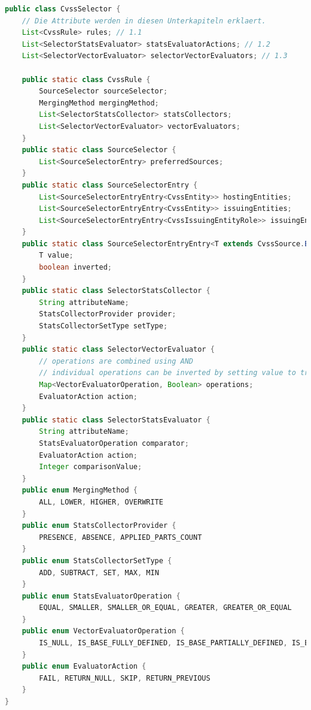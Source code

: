 \begin{lstlisting}[language=Java, label={lst:cvss-selector-class-attributes}, caption={CVSS-Selektor Klassen}, basicstyle=\scriptsize]
public class CvssSelector {
    // Die Attribute werden in diesen Unterkapiteln erklaert.
    List<CvssRule> rules; // 1.1
    List<SelectorStatsEvaluator> statsEvaluatorActions; // 1.2
    List<SelectorVectorEvaluator> selectorVectorEvaluators; // 1.3

    public static class CvssRule {
        SourceSelector sourceSelector;
        MergingMethod mergingMethod;
        List<SelectorStatsCollector> statsCollectors;
        List<SelectorVectorEvaluator> vectorEvaluators;
    }
    public static class SourceSelector {
        List<SourceSelectorEntry> preferredSources;
    }
    public static class SourceSelectorEntry {
        List<SourceSelectorEntryEntry<CvssEntity>> hostingEntities;
        List<SourceSelectorEntryEntry<CvssEntity>> issuingEntities;
        List<SourceSelectorEntryEntry<CvssIssuingEntityRole>> issuingEntityRoles;
    }
    public static class SourceSelectorEntryEntry<T extends CvssSource.EntityNameProvider> {
        T value;
        boolean inverted;
    }
    public static class SelectorStatsCollector {
        String attributeName;
        StatsCollectorProvider provider;
        StatsCollectorSetType setType;
    }
    public static class SelectorVectorEvaluator {
        // operations are combined using AND
        // individual operations can be inverted by setting value to true
        Map<VectorEvaluatorOperation, Boolean> operations;
        EvaluatorAction action;
    }
    public static class SelectorStatsEvaluator {
        String attributeName;
        StatsEvaluatorOperation comparator;
        EvaluatorAction action;
        Integer comparisonValue;
    }
    public enum MergingMethod {
        ALL, LOWER, HIGHER, OVERWRITE
    }
    public enum StatsCollectorProvider {
        PRESENCE, ABSENCE, APPLIED_PARTS_COUNT
    }
    public enum StatsCollectorSetType {
        ADD, SUBTRACT, SET, MAX, MIN
    }
    public enum StatsEvaluatorOperation {
        EQUAL, SMALLER, SMALLER_OR_EQUAL, GREATER, GREATER_OR_EQUAL
    }
    public enum VectorEvaluatorOperation {
        IS_NULL, IS_BASE_FULLY_DEFINED, IS_BASE_PARTIALLY_DEFINED, IS_ENVIRONMENTAL_PARTIALLY_DEFINED, IS_TEMPORAL_PARTIALLY_DEFINED, IS_THREAT_PARTIALLY_DEFINED
    }
    public enum EvaluatorAction {
        FAIL, RETURN_NULL, SKIP, RETURN_PREVIOUS
    }
}
\end{lstlisting}

